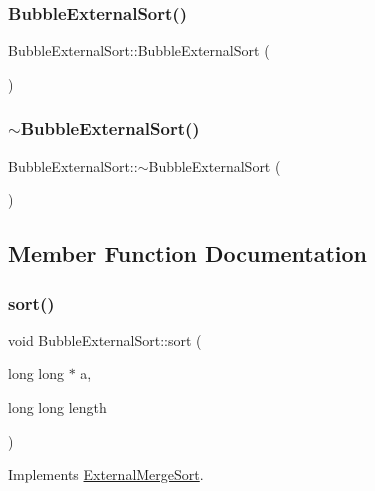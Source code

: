 \subsubsection{\texorpdfstring{Bubble\+External\+Sort()}{BubbleExternalSort()}}
{\footnotesize\ttfamily Bubble\+External\+Sort\+::\+Bubble\+External\+Sort (\begin{DoxyParamCaption}{ }\end{DoxyParamCaption})}

\hypertarget{class_bubble_external_sort_a2075c6e2117da937f397ceb993336e81}{}\label{class_bubble_external_sort_a2075c6e2117da937f397ceb993336e81} 
\subsubsection{\texorpdfstring{$\sim$\+Bubble\+External\+Sort()}{~BubbleExternalSort()}}
{\footnotesize\ttfamily Bubble\+External\+Sort\+::$\sim$\+Bubble\+External\+Sort (\begin{DoxyParamCaption}{ }\end{DoxyParamCaption})}



\subsection{Member Function Documentation}
\hypertarget{class_bubble_external_sort_ac2c8c1a8dad0f0f99a176d3641b7625c}{}\label{class_bubble_external_sort_ac2c8c1a8dad0f0f99a176d3641b7625c} 
\subsubsection{\texorpdfstring{sort()}{sort()}}
{\footnotesize\ttfamily void Bubble\+External\+Sort\+::sort (\begin{DoxyParamCaption}\item[{long long $\ast$}]{a,  }\item[{long long}]{length }\end{DoxyParamCaption})\hspace{0.3cm}{\ttfamily [virtual]}}



Implements \hyperlink{class_external_merge_sort_af6412221cc797a846243a343ccc12dba}{External\+Merge\+Sort}.



